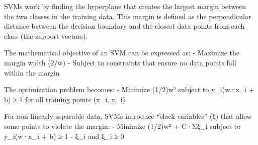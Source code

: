 \documentclass[
  letterpaper,
  DIV=11,
  numbers=noendperiod]{scrreprt}
\begin{document}
SVMs work by finding the hyperplane that creates the largest margin
between the two classes in the training data. This margin is defined as
the perpendicular distance between the decision boundary and the closest
data points from each class (the support vectors).

The mathematical objective of an SVM can be expressed as: - Maximize the
margin width (2/\textbar\textbar w\textbar\textbar) - Subject to
constraints that ensure no data points fall within the margin

The optimization problem becomes: - Minimize
(1/2)\textbar\textbar w\textbar\textbar² subject to y\_i(w·x\_i + b) ≥ 1
for all training points (x\_i, y\_i)

For non-linearly separable data, SVMs introduce ``slack variables'' (ξ)
that allow some points to violate the margin: - Minimize
(1/2)\textbar\textbar w\textbar\textbar² + C·Σξ\_i subject to
y\_i(w·x\_i + b) ≥ 1 - ξ\_i and ξ\_i ≥ 0
\end{document}
